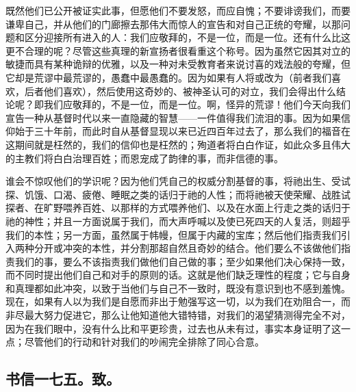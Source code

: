 既然他们已公开被证实此事，但愿他们不要发怒，而应自愧；不要诽谤我们，而要谦卑自己，并从他们的门廊擦去那伟大而惊人的宣告和对自己正统的夸耀，以那问题和区分迎接所有进入的人：我们应敬拜的，不是一位，而是一位。还有什么比这更不合理的呢？尽管这些真理的新宣扬者很看重这个称号。因为虽然它因其对立的敏捷而具有某种诡辩的优雅，以及一种对未受教育者来说讨喜的戏法般的夸耀，但它却是荒谬中最荒谬的，愚蠢中最愚蠢的。因为如果有人将或改为（前者我们喜欢，后者他们喜欢），然后使用这奇妙的、被神圣认可的对立，我们会得出什么结论呢？即我们应敬拜的，不是一位，而是一位。啊，怪异的荒谬！他们今天向我们宣告一种从基督时代以来一直隐藏的智慧——一件值得我们流泪的事。因为如果信仰始于三十年前，而此时自从基督显现以来已近四百年过去了，那么我们的福音在这期间就是枉然的，我们的信仰也是枉然的；殉道者将白白作证，如此众多且伟大的主教们将白白治理百姓；而恩宠成了韵律的事，而非信德的事。\par

谁会不惊叹他们的学识呢？因为他们凭自己的权威分割基督的事，将祂出生、受试探、饥饿、口渴、疲倦、睡眠之类的话归于祂的人性；而将祂被天使荣耀、战胜试探者、在旷野喂养百姓、以那样的方式喂养他们、以及在水面上行走之类的话归于祂的神性；并且一方面说属于我们，而大声呼喊以及使已死四天的人复活，则超乎我们的本性；另一方面，虽然属于帏幔，但属于内藏的宝库；然后他们指责我们引入两种分开或冲突的本性，并分割那超自然且奇妙的结合。他们要么不该做他们指责我们的事，要么不该指责我们做他们自己做的事；至少如果他们决心保持一致，而不同时提出他们自己和对手的原则的话。这就是他们缺乏理性的程度；它与自身和真理都如此冲突，以致于当他们与自己不一致时，既没有意识到也不感到羞愧。现在，如果有人以为我们是自愿而非出于勉强写这一切，以为我们在劝阻合一，而非尽最大努力促进它，那么让他知道他大错特错，对我们的渴望猜测得完全不对，因为在我们眼中，没有什么比和平更珍贵，过去也从未有过，事实本身证明了这一点；尽管他们的行动和针对我们的吵闹完全排除了同心合意。\par


\subsection{书信一七五。致。}

